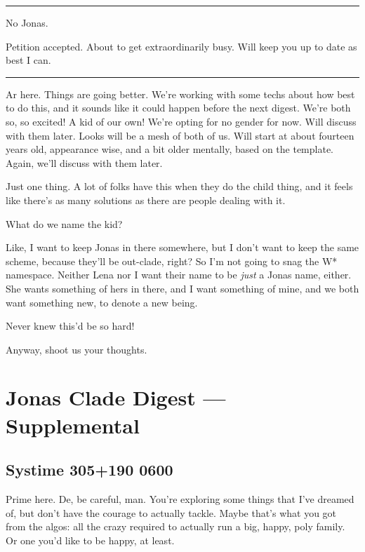 \begin{center}\rule{0.5\linewidth}{\linethickness}\end{center}

No Jonas.

Petition accepted. About to get extraordinarily busy. Will keep you up to date as best I can.

\begin{center}\rule{0.5\linewidth}{\linethickness}\end{center}

Ar here. Things are going better. We're working with some techs about how best to do this, and it sounds like it could happen before the next digest. We're both so, so excited! A kid of our own! We're opting for no gender for now. Will discuss with them later. Looks will be a mesh of both of us. Will start at about fourteen years old, appearance wise, and a bit older mentally, based on the template. Again, we'll discuss with them later.

Just one thing. A lot of folks have this when they do the child thing, and it feels like there's as many solutions as there are people dealing with it.

What do we name the kid?

Like, I want to keep Jonas in there somewhere, but I don't want to keep the same scheme, because they'll be out-clade, right? So I'm not going to snag the W* namespace. Neither Lena nor I want their name to be \emph{just} a Jonas name, either. She wants something of hers in there, and I want something of mine, and we both want something new, to denote a new being.

Never knew this'd be so hard!

Anyway, shoot us your thoughts.

\newpage
\hypertarget{jonas-clade-digest-supplemental}{%
\section*{Jonas Clade Digest --- Supplemental}\label{jonas-clade-digest-supplemental}}

\hypertarget{systime-305190-0600}{%
\subsection*{Systime 305+190 0600}\label{systime-305190-0600}}

Prime here. De, be careful, man. You're exploring some things that I've dreamed of, but don't have the courage to actually tackle. Maybe that's what you got from the algos: all the crazy required to actually run a big, happy, poly family. Or one you'd like to be happy, at least.

